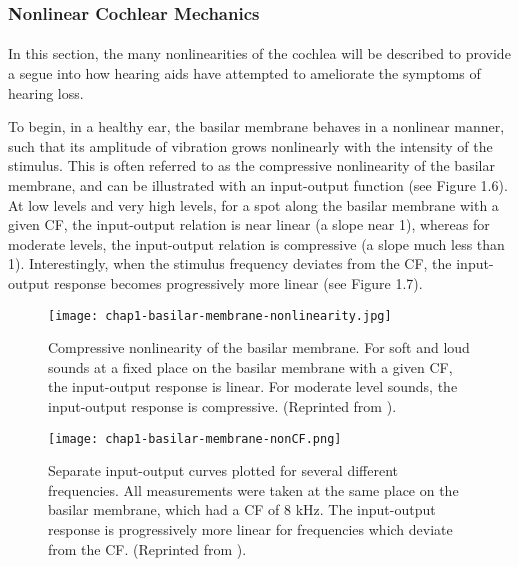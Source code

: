 \subsubsection{Nonlinear Cochlear Mechanics}
\paragraph{}In this section, the many nonlinearities of the cochlea will be described to provide a segue into how hearing aids have attempted to ameliorate the symptoms of hearing loss.

To begin, in a healthy ear, the basilar membrane behaves in a nonlinear manner, such that its amplitude of vibration grows nonlinearly with the intensity of the stimulus.  This is often referred to as the compressive nonlinearity of the basilar membrane, and can be illustrated with an input-output function (see Figure 1.6).  At low levels and very high levels, for a spot along the basilar membrane with a given CF, the input-output relation is near linear (a slope near 1), whereas for moderate levels, the input-output relation is compressive (a slope much less than 1).  Interestingly, when the stimulus frequency deviates from the CF, the input-output response becomes progressively more linear (see Figure 1.7).

\begin{figure}[htbp]
\begin{center}
\texttt{[image: chap1-basilar-membrane-nonlinearity.jpg]} \\
\caption[Compressive nonlinearity of the basilar membrane]{Compressive nonlinearity of the basilar membrane.  For soft and loud sounds at a fixed place on the basilar membrane with a given CF, the input-output response is linear.  For moderate level sounds, the input-output response is compressive. (Reprinted from ).}
\label{bm-compressive-nonlinearity}
\end{center}
\end{figure}

\begin{figure}[htbp]
\begin{center}
\texttt{[image: chap1-basilar-membrane-nonCF.png]} \\
\caption[Basilar membrane response with deviations from the CF]{Separate input-output curves plotted for several different frequencies.  All measurements were taken at the same place on the basilar membrane, which had a CF of 8 kHz.  The input-output response is progressively more linear for frequencies which deviate from the CF.  (Reprinted from ).}
\label{bm-nonCF}
\end{center}
\end{figure}

